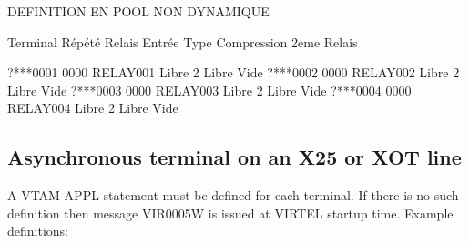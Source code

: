 \documentclass[letterpaper,10pt,english]{sphinxmanual}
\begin{document}
\begin{sphinxVerbatim}[commandchars=\\\{\}]
DEFINITION EN POOL NON DYNAMIQUE

Terminal Répété Relais Entrée Type Compression 2eme Relais

?***0001 0000 RELAY001 Libre 2 Libre Vide
?***0002 0000 RELAY002 Libre 2 Libre Vide
?***0003 0000 RELAY003 Libre 2 Libre Vide
?***0004 0000 RELAY004 Libre 2 Libre Vide
\end{sphinxVerbatim}


\subsection{Asynchronous terminal on an X25 or XOT line}
\label{\detokenize{connectivity_guide:index-147}}\label{\detokenize{connectivity_guide:asynchronous-terminal-on-an-x25-or-xot-line}}
A VTAM APPL statement must be defined for each terminal. If there is no such definition then message VIR0005W is issued at VIRTEL startup time. Example definitions:

\begin{sphinxVerbatim}[commandchars=\\\{\}]
   

                 

                              
                              
                              
                              
\end{sphinxVerbatim}

\begin{sphinxVerbatim}[commandchars=\\\{\}]
   

                 

                              
                              
\end{sphinxVerbatim}
\end{document}
